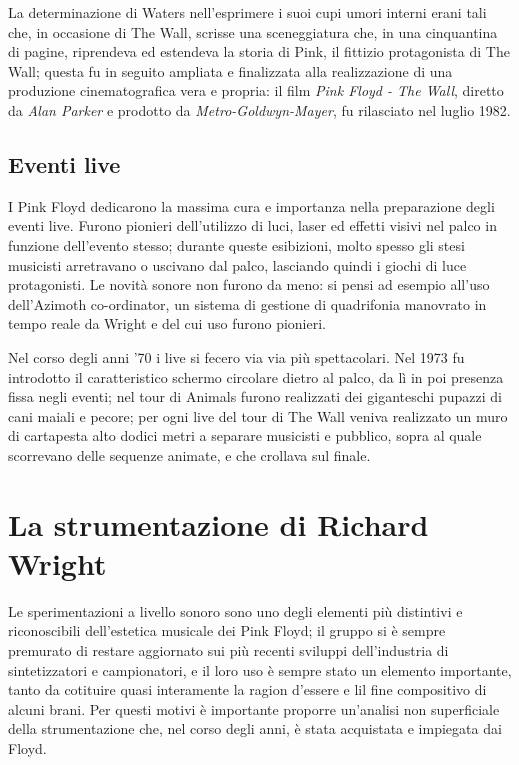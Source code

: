 \documentclass[class=book, crop=false, oneside, 12pt]{standalone}
\begin{document}
    La determinazione di Waters nell'esprimere i suoi cupi umori interni erani tali che, in occasione di The Wall, scrisse una sceneggiatura che, in una cinquantina di pagine, riprendeva ed estendeva la storia di Pink, il fittizio protagonista di The Wall; questa fu in seguito ampliata e finalizzata alla realizzazione di una produzione cinematografica vera e propria: il film \emph{Pink Floyd - The Wall}, diretto da \emph{Alan Parker} e prodotto da \emph{Metro-Goldwyn-Mayer}, fu rilasciato nel luglio 1982.

    \subsection{Eventi live}
    I Pink Floyd dedicarono la massima cura e importanza nella preparazione degli eventi live. Furono pionieri dell'utilizzo di luci, laser ed effetti visivi nel palco in funzione dell'evento stesso; durante queste esibizioni, molto spesso gli stesi musicisti arretravano o uscivano dal palco, lasciando quindi i giochi di luce protagonisti. Le novità sonore non furono da meno: si pensi ad esempio all'uso dell'Azimoth co-ordinator, un sistema di gestione di quadrifonia manovrato in tempo reale da Wright e del cui uso furono pionieri.

    Nel corso degli anni '70 i live si fecero via via più spettacolari. Nel 1973 fu introdotto il caratteristico schermo circolare dietro al palco, da lì in poi presenza fissa negli eventi; nel tour di Animals furono realizzati dei giganteschi pupazzi di cani maiali e pecore; per ogni live del tour di The Wall veniva realizzato un muro di cartapesta alto dodici metri a separare musicisti e pubblico, sopra al quale scorrevano delle sequenze animate, e che crollava sul finale.



    \section{La strumentazione di Richard Wright}
    Le sperimentazioni a livello sonoro sono uno degli elementi più distintivi e riconoscibili dell'estetica musicale dei Pink Floyd; il gruppo si è sempre premurato di restare aggiornato sui più recenti sviluppi dell'industria di sintetizzatori e campionatori, e il loro uso è sempre stato un elemento importante, tanto da cotituire quasi interamente la ragion d'essere e lil fine compositivo di alcuni brani. Per questi motivi è importante proporre un'analisi non superficiale della strumentazione che, nel corso degli anni, è stata acquistata e impiegata dai Floyd.
\end{document}
